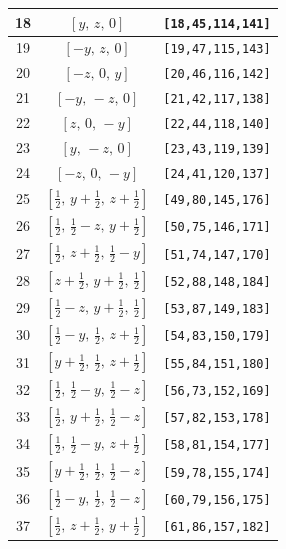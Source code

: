 \documentclass[fleqn,8pt]{jsarticle}
\begin{document}
\begin{longtable}{ccc}
18 & $\left[ y,\, z,\, 0 \right]$ & {\tt [18,45,114,141]} \\ \hline
19 & $\left[ - y,\, z,\, 0 \right]$ & {\tt [19,47,115,143]} \\ \hline
20 & $\left[ - z,\, 0,\, y \right]$ & {\tt [20,46,116,142]} \\ \hline
21 & $\left[ - y,\, - z,\, 0 \right]$ & {\tt [21,42,117,138]} \\ \hline
22 & $\left[ z,\, 0,\, - y \right]$ & {\tt [22,44,118,140]} \\ \hline
23 & $\left[ y,\, - z,\, 0 \right]$ & {\tt [23,43,119,139]} \\ \hline
24 & $\left[ - z,\, 0,\, - y \right]$ & {\tt [24,41,120,137]} \\ \hline
25 & $\left[ \frac{1}{2},\, y + \frac{1}{2},\, z + \frac{1}{2} \right]$ & {\tt [49,80,145,176]} \\ \hline
26 & $\left[ \frac{1}{2},\, \frac{1}{2} - z,\, y + \frac{1}{2} \right]$ & {\tt [50,75,146,171]} \\ \hline
27 & $\left[ \frac{1}{2},\, z + \frac{1}{2},\, \frac{1}{2} - y \right]$ & {\tt [51,74,147,170]} \\ \hline
28 & $\left[ z + \frac{1}{2},\, y + \frac{1}{2},\, \frac{1}{2} \right]$ & {\tt [52,88,148,184]} \\ \hline
29 & $\left[ \frac{1}{2} - z,\, y + \frac{1}{2},\, \frac{1}{2} \right]$ & {\tt [53,87,149,183]} \\ \hline
30 & $\left[ \frac{1}{2} - y,\, \frac{1}{2},\, z + \frac{1}{2} \right]$ & {\tt [54,83,150,179]} \\ \hline
31 & $\left[ y + \frac{1}{2},\, \frac{1}{2},\, z + \frac{1}{2} \right]$ & {\tt [55,84,151,180]} \\ \hline
32 & $\left[ \frac{1}{2},\, \frac{1}{2} - y,\, \frac{1}{2} - z \right]$ & {\tt [56,73,152,169]} \\ \hline
33 & $\left[ \frac{1}{2},\, y + \frac{1}{2},\, \frac{1}{2} - z \right]$ & {\tt [57,82,153,178]} \\ \hline
34 & $\left[ \frac{1}{2},\, \frac{1}{2} - y,\, z + \frac{1}{2} \right]$ & {\tt [58,81,154,177]} \\ \hline
35 & $\left[ y + \frac{1}{2},\, \frac{1}{2},\, \frac{1}{2} - z \right]$ & {\tt [59,78,155,174]} \\ \hline
36 & $\left[ \frac{1}{2} - y,\, \frac{1}{2},\, \frac{1}{2} - z \right]$ & {\tt [60,79,156,175]} \\ \hline
37 & $\left[ \frac{1}{2},\, z + \frac{1}{2},\, y + \frac{1}{2} \right]$ & {\tt [61,86,157,182]} \\ \hline

\end{longtable}
\end{document}
